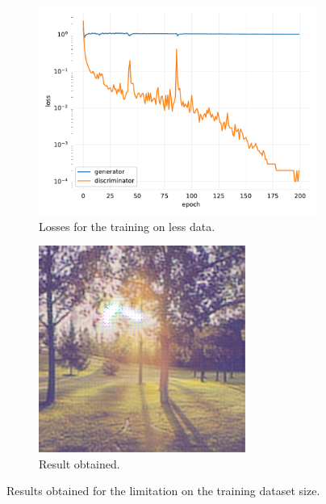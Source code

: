 \documentclass[twocolumn,superscriptaddress,aps,floatfix, nofootinbib]{revtex4-1}
\begin{document}
    \begin{figure}[ht]
        \centering
        \begin{subfigure}[b]{0.22\textwidth}
            \centering
            \includegraphics[width=\textwidth]{resources/png/gan-losses/testless.pdf}
            \caption{Losses for the training on less data.}
        \end{subfigure}
        \hfill
        \begin{subfigure}[b]{0.22\textwidth}
            \centering
            \includegraphics[width=\textwidth]{resources/png/gan-results/less1.png.png}
            \caption{Result obtained.}
            \label{fig:less1}
        \end{subfigure}
        \caption{Results obtained for the limitation on the training dataset size.}
    \end{figure}
    
\end{document}
